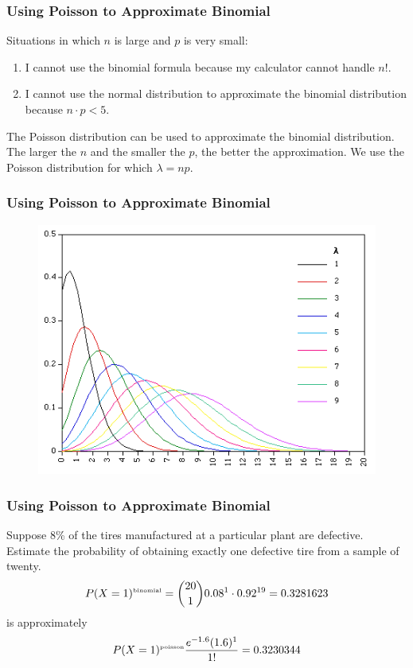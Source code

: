 \documentclass[xcolor=dvipsnames]{beamer}
\begin{document}
\begin{frame}
  \frametitle{Using Poisson to Approximate Binomial}
  Situations in which $n$ is large and $p$ is very small:
  \begin{enumerate}
  \item I cannot use the binomial formula because my calculator cannot
    handle $n!$.
  \item I cannot use the normal distribution to approximate the
    binomial distribution because $n\cdot{}p<5$.
  \end{enumerate}
  The Poisson distribution can be used to approximate the binomial
  distribution. The larger the $n$ and the smaller the $p$, the better
  the approximation. We use the Poisson distribution for which
  $\lambda=np$.
\end{frame}

\begin{frame}
  \frametitle{Using Poisson to Approximate Binomial}
    \begin{figure}[h]
    \includegraphics[scale=.62]{./diagrams/poisdist.png}
  \end{figure}
\end{frame}

\begin{frame}
  \frametitle{Using Poisson to Approximate Binomial}
   Suppose 8\% of the tires manufactured
  at a particular plant are defective. Estimate the probability of obtaining
  exactly one defective tire from a sample of twenty.
  \begin{equation}
    \label{eq:eikaiche}
    P(X=1)^{\mbox{\tiny binomial}}={20\choose{}1}0.08^{1}\cdot0.92^{19}=0.3281623
  \end{equation}
  is approximately
  \begin{equation}
    \label{eq:aihuroot}
    P(X=1)^{\mbox{\tiny poisson}}\frac{e^{-1.6}(1.6)^{1}}{1!}=0.3230344
  \end{equation}
\end{frame}
\end{document}
